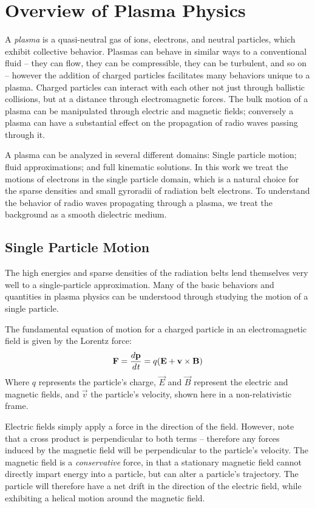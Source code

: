 \section{Overview of Plasma Physics}
A \emph{plasma} is a quasi-neutral gas of ions, electrons, and neutral particles, which exhibit collective behavior. Plasmas can behave in similar ways to a conventional fluid -- they can flow, they can be compressible, they can be turbulent, and so on -- however the addition of charged particles facilitates many behaviors unique to a plasma. Charged particles can interact with each other not just through ballistic collisions, but at a distance through electromagnetic forces. The bulk motion of a plasma can be manipulated through electric and magnetic fields; conversely a plasma can have a substantial effect on the propagation of radio waves passing through it. 

A plasma can be analyzed in several different domains: Single particle motion; fluid approximations; and full kinematic solutions. In this work we treat the motions of electrons in the single particle domain, which is a natural choice for the sparse densities and small gyroradii of radiation belt electrons. To understand the behavior of radio waves propagating through a plasma, we treat the background as a smooth dielectric medium. 

\subsection{Single Particle Motion}
The high energies and sparse densities of the radiation belts lend themselves very well to a single-particle approximation. Many of the basic behaviors and quantities in plasma physics can be understood through studying the motion of a single particle.

The fundamental equation of motion for a charged particle in an electromagnetic field is given by the Lorentz force:
\begin{equation}
\vec{F} = \frac{d\vec{p}}{d\emph{t}} = q(\vec{E} + \vec{v}\times\vec{B})
\label{eqn:lorentz_force}
\end{equation}
Where $q$ represents the particle's charge, $\vec{E}$ and $\vec{B}$ represent the electric and magnetic fields, and $\vec{v}$ the particle's velocity, shown here in a non-relativistic frame.

Electric fields simply apply a force in the direction of the field. However, note that a cross product is perpendicular to both terms -- therefore any forces induced by the magnetic field will be perpendicular to the particle's velocity. The magnetic field is a \emph{conservative} force, in that a stationary magnetic field cannot directly impart energy into a particle, but can alter a particle's trajectory. The particle will therefore have a net drift in the direction of the electric field, while exhibiting a helical motion around the magnetic field.

